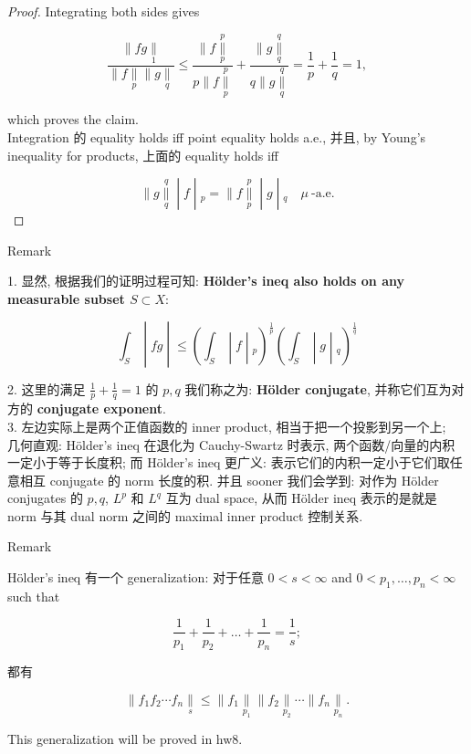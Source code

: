 \begin{proof}
Integrating both sides gives

\[\frac{\parallel fg\underset{1}{\parallel}}{\parallel f\underset{p}{\parallel} \parallel g\underset{q}{\parallel}} \leq \frac{\parallel f\underset{p}{\overset{p}{\parallel}}}{p \parallel f\underset{p}{\overset{p}{\parallel}}} + \frac{\parallel g\underset{q}{\overset{q}{\parallel}}}{q \parallel g\underset{q}{\overset{q}{\parallel}}} = \frac{1}{p} + \frac{1}{q} = 1,\]

which proves the claim.\\
Integration 的 equality holds iff point equality holds a.e., 并且, by Young's inequality for products, 上面的 equality holds iff

\[\left. \parallel g\underset{q}{\overset{q}{\parallel}} \middle| f \middle| {}_{p} = \parallel f\underset{p}{\overset{p}{\parallel}} \middle| g \middle| {}_{q}\quad\mu\ \text{-a.e.} \right.\]

\end{proof}

\begin{qlremark}{Remark}

1. 显然, 根据我们的证明过程可知: \textbf{Hölder's ineq also holds on any measurable subset \(S \subset X\)}:

\[\left. \int_{S} \middle| fg \middle| \leq (\int_{S} \middle| f \middle| {}_{p})^{\frac{1}{p}}(\int_{S} \middle| g \middle| {}_{q})^{\frac{1}{q}} \right.\]

2. 这里的满足 \(\frac{1}{p} + \frac{1}{q} = 1\) 的 \(p,q\) 我们称之为: \textbf{Hölder conjugate}, 并称它们互为对方的 \textbf{conjugate exponent}.\\
3. 左边实际上是两个正值函数的 inner product, 相当于把一个投影到另一个上;\\
几何直观: Hölder's ineq 在退化为 Cauchy-Swartz 时表示, 两个函数/向量的内积一定小于等于长度积; 而 Hölder's ineq 更广义: 表示它们的内积一定小于它们取任意相互 conjugate 的 norm 长度的积. 并且 sooner 我们会学到: 对作为 Hölder conjugates 的 \(p,q\), \(L^{p}\) 和 \(L^{q}\) 互为 dual space, 从而 Hölder ineq 表示的是就是 norm 与其 dual norm 之间的 maximal inner product 控制关系.

\end{qlremark}

\begin{qlremark}{Remark}

Hölder's ineq 有一个 generalization: 对于任意 \(0 < s < \infty\) and \(0 < p_{1},\ldots,p_{n} < \infty\) such that

\[\frac{1}{p_{1}} + \frac{1}{p_{2}} + \ldots + \frac{1}{p_{n}} = \frac{1}{s};\]

都有

\[\parallel f_{1}f_{2}\cdots f_{n}\underset{s}{\parallel} \leq \parallel f_{1}\underset{p_{1}}{\parallel} \parallel f_{2}\underset{p_{2}}{\parallel}\cdots \parallel f_{n}\underset{p_{n}}{\parallel}.\]

This generalization will be proved in hw8.

\end{qlremark}

